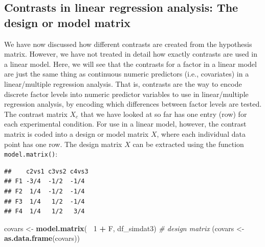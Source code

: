 \documentclass[12pt,]{krantz}
\newenvironment{Shaded}{\begin{snugshade}}{\end{snugshade}}
\newcommand{\CommentTok}[1]{\textcolor[rgb]{0.56,0.35,0.01}{\textit{#1}}}
\newcommand{\DecValTok}[1]{\textcolor[rgb]{0.00,0.00,0.81}{#1}}
\newcommand{\KeywordTok}[1]{\textcolor[rgb]{0.13,0.29,0.53}{\textbf{#1}}}
\newcommand{\NormalTok}[1]{#1}
\newcommand{\OperatorTok}[1]{\textcolor[rgb]{0.81,0.36,0.00}{\textbf{#1}}}
\newcommand{\StringTok}[1]{\textcolor[rgb]{0.31,0.60,0.02}{#1}}
\theoremstyle{definition}
\theoremstyle{definition}
\theoremstyle{definition}
\theoremstyle{remark}
\begin{document}
\hypertarget{contrasts-in-linear-regression-analysis-the-design-or-model-matrix}{%
\subsection{Contrasts in linear regression analysis: The design or model matrix}\label{contrasts-in-linear-regression-analysis-the-design-or-model-matrix}}

We have now discussed how different contrasts are created from the hypothesis matrix. However, we have not treated in detail how exactly contrasts are used in a linear model. Here, we will see that the contrasts for a factor in a linear model are just the same thing as continuous numeric predictors (i.e., covariates) in a linear/multiple regression analysis. That is, contrasts are the way to encode discrete factor levels into numeric predictor variables to use in linear/multiple regression analysis, by encoding which differences between factor levels are tested.
The contrast matrix \(X_c\) that we have looked at so far has one entry (row) for each experimental condition. For use in a linear model, however, the contrast matrix is coded into a design or model matrix \(X\), where each individual data point has one row. The design matrix \(X\) can be extracted using the function \texttt{model.matrix()}:

\begin{Shaded}
\end{Shaded}

\begin{verbatim}
##    c2vs1 c3vs2 c4vs3
## F1 -3/4  -1/2  -1/4 
## F2  1/4  -1/2  -1/4 
## F3  1/4   1/2  -1/4 
## F4  1/4   1/2   3/4
\end{verbatim}

\begin{Shaded}
\begin{Highlighting}[]
\NormalTok{covars <-}\StringTok{ }\KeywordTok{model.matrix}\NormalTok{(}\OperatorTok{~}\StringTok{ }\DecValTok{1} \OperatorTok{+}\StringTok{ }\NormalTok{F, df_simdat3) }\CommentTok{# design matrix}
\NormalTok{(covars <-}\StringTok{ }\KeywordTok{as.data.frame}\NormalTok{(covars))}
\end{Highlighting}
\end{Shaded}
\end{document}
